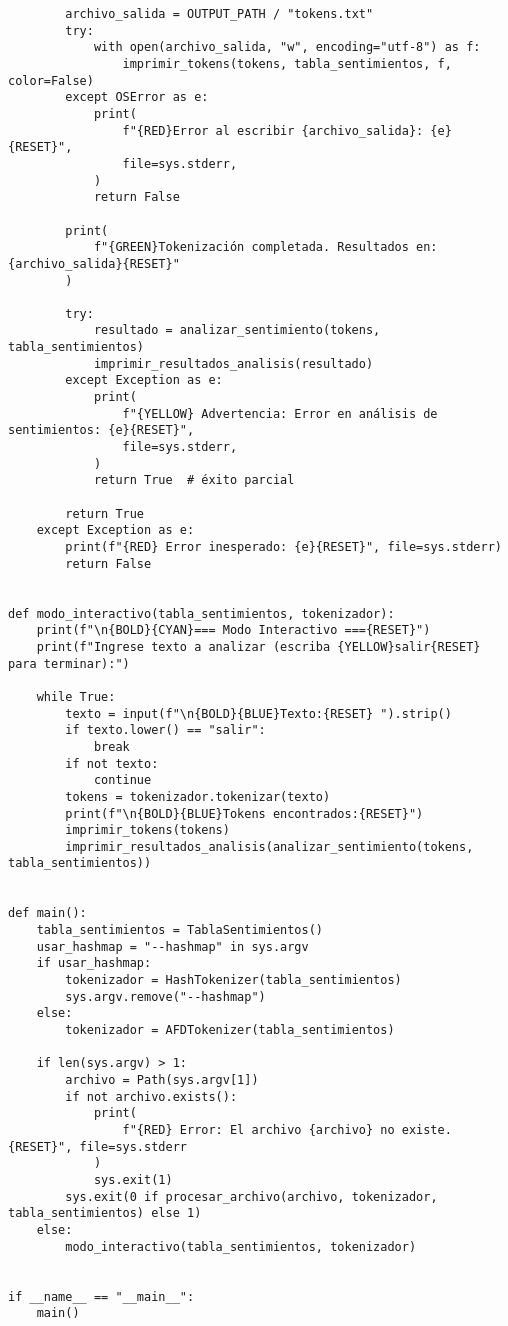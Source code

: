 \begin{lstlisting}
        archivo_salida = OUTPUT_PATH / "tokens.txt"
        try:
            with open(archivo_salida, "w", encoding="utf-8") as f:
                imprimir_tokens(tokens, tabla_sentimientos, f, color=False)
        except OSError as e:
            print(
                f"{RED}Error al escribir {archivo_salida}: {e}{RESET}",
                file=sys.stderr,
            )
            return False

        print(
            f"{GREEN}Tokenización completada. Resultados en: {archivo_salida}{RESET}"
        )

        try:
            resultado = analizar_sentimiento(tokens, tabla_sentimientos)
            imprimir_resultados_analisis(resultado)
        except Exception as e:
            print(
                f"{YELLOW} Advertencia: Error en análisis de sentimientos: {e}{RESET}",
                file=sys.stderr,
            )
            return True  # éxito parcial

        return True
    except Exception as e:
        print(f"{RED} Error inesperado: {e}{RESET}", file=sys.stderr)
        return False


def modo_interactivo(tabla_sentimientos, tokenizador):
    print(f"\n{BOLD}{CYAN}=== Modo Interactivo ==={RESET}")
    print(f"Ingrese texto a analizar (escriba {YELLOW}salir{RESET} para terminar):")

    while True:
        texto = input(f"\n{BOLD}{BLUE}Texto:{RESET} ").strip()
        if texto.lower() == "salir":
            break
        if not texto:
            continue
        tokens = tokenizador.tokenizar(texto)
        print(f"\n{BOLD}{BLUE}Tokens encontrados:{RESET}")
        imprimir_tokens(tokens)
        imprimir_resultados_analisis(analizar_sentimiento(tokens, tabla_sentimientos))


def main():
    tabla_sentimientos = TablaSentimientos()
    usar_hashmap = "--hashmap" in sys.argv
    if usar_hashmap:
        tokenizador = HashTokenizer(tabla_sentimientos)
        sys.argv.remove("--hashmap")
    else:
        tokenizador = AFDTokenizer(tabla_sentimientos)

    if len(sys.argv) > 1:
        archivo = Path(sys.argv[1])
        if not archivo.exists():
            print(
                f"{RED} Error: El archivo {archivo} no existe.{RESET}", file=sys.stderr
            )
            sys.exit(1)
        sys.exit(0 if procesar_archivo(archivo, tokenizador, tabla_sentimientos) else 1)
    else:
        modo_interactivo(tabla_sentimientos, tokenizador)


if __name__ == "__main__":
    main()
\end{lstlisting}
